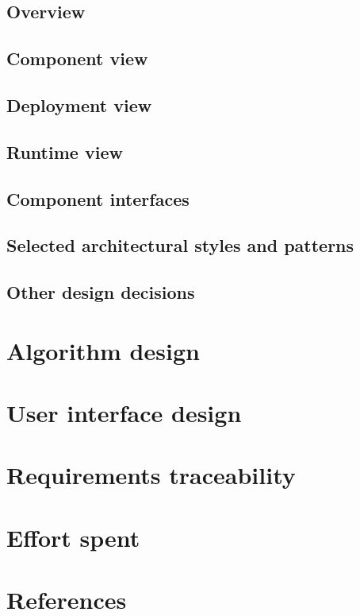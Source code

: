 \documentclass[12pt, a4paper]{article}
\begin{document}
		\subsection{Overview}

		\subsection{Component view}
			

		\subsection{Deployment view}

		\subsection{Runtime view}

		\subsection{Component interfaces}

		\subsection{Selected  architectural  styles  and  patterns}

		\subsection{Other design decisions}

	\section{Algorithm design}

	\section{User interface design}

	\section{Requirements traceability}

	\section{Effort spent}

	\section{References}
\end{document}
